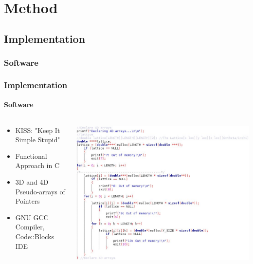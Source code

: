 \documentclass{beamer}
\begin{document}
	\section{Method}
	\subsection{Implementation}
	\subsubsection*{Software}
  \begin{frame}
    \frametitle{Implementation}
    \framesubtitle{Software}
    \begin{columns}[t]
    	\begin{column}[T]{5cm}
    		\begin{itemize}
    			\item KISS: "Keep It Simple Stupid"
    			\item Functional Approach in C
    			\item 3D and 4D Pseudo-arrays of Pointers
    			\item GNU GCC Compiler, Code::Blocks IDE
   			\end{itemize}
      \end{column}
    	\begin{column}[T]{6.5cm}
    		\includegraphics[scale=0.35]{code1}
    	\end{column}
    \end{columns}
  \end{frame}
\end{document}
